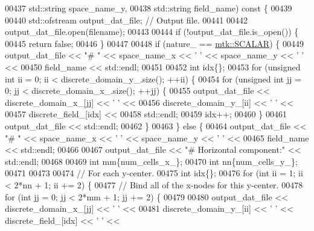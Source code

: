 \begin{DoxyCode}
00437                                     std::string space\_name\_y,
00438                                     std::string field\_name)\textcolor{keyword}{ const }\{
00439 
00440   std::ofstream output\_dat\_file;  \textcolor{comment}{// Output file.}
00441 
00442   output\_dat\_file.open(filename);
00443 
00444   \textcolor{keywordflow}{if} (!output\_dat\_file.is\_open()) \{
00445     \textcolor{keywordflow}{return} \textcolor{keyword}{false};
00446   \}
00447 
00448   \textcolor{keywordflow}{if} (nature\_ == \hyperlink{namespacemtk_ga4c54f2a329cfb4e56213b02a259d19e2af481d45bd70d41381c7d72e200889205}{mtk::SCALAR}) \{
00449     output\_dat\_file << \textcolor{stringliteral}{"# "} << space\_name\_x <<  \textcolor{charliteral}{' '} << space\_name\_y << \textcolor{charliteral}{' '} <<
00450       field\_name << std::endl;
00451 
00452     \textcolor{keywordtype}{int} idx\{\};
00453     \textcolor{keywordflow}{for} (\textcolor{keywordtype}{unsigned} \textcolor{keywordtype}{int} ii = 0; ii < discrete\_domain\_y\_.size(); ++ii) \{
00454       \textcolor{keywordflow}{for} (\textcolor{keywordtype}{unsigned} \textcolor{keywordtype}{int} jj = 0; jj < discrete\_domain\_x\_.size(); ++jj) \{
00455         output\_dat\_file << discrete\_domain\_x\_[jj] << \textcolor{charliteral}{' '} <<
00456                            discrete\_domain\_y\_[ii] << \textcolor{charliteral}{' '} <<
00457                            discrete\_field\_[idx] <<
00458                           std::endl;
00459         idx++;
00460       \}
00461       output\_dat\_file << std::endl;
00462     \}
00463   \} \textcolor{keywordflow}{else} \{
00464     output\_dat\_file << \textcolor{stringliteral}{"# "} << space\_name\_x <<  \textcolor{charliteral}{' '} << space\_name\_y << \textcolor{charliteral}{' '} <<
00465       field\_name << std::endl;
00466 
00467     output\_dat\_file << \textcolor{stringliteral}{"# Horizontal component:"} << std::endl;
00468 
00469     \textcolor{keywordtype}{int} mm\{num\_cells\_x\_\};
00470     \textcolor{keywordtype}{int} nn\{num\_cells\_y\_\};
00471 
00473 
00474     \textcolor{comment}{// For each y-center.}
00475     \textcolor{keywordtype}{int} idx\{\};
00476     \textcolor{keywordflow}{for} (\textcolor{keywordtype}{int} ii = 1; ii < 2*nn + 1; ii += 2) \{
00477       \textcolor{comment}{// Bind all of the x-nodes for this y-center.}
00478       \textcolor{keywordflow}{for} (\textcolor{keywordtype}{int} jj = 0; jj < 2*mm + 1; jj += 2) \{
00479 
00480         output\_dat\_file << discrete\_domain\_x\_[jj] << \textcolor{charliteral}{' '} <<
00481           discrete\_domain\_y\_[ii] << \textcolor{charliteral}{' '} << discrete\_field\_[idx] << \textcolor{charliteral}{' '} <<

\end{DoxyCode}
